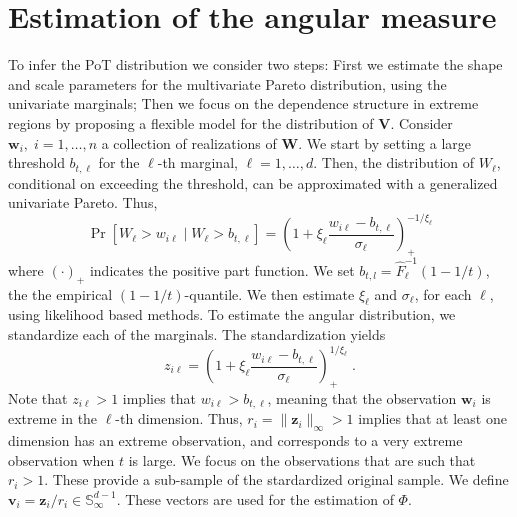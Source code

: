 \section{Estimation of the angular measure\label{sec:methodology}}

To infer the PoT distribution we consider two steps: First we 
    estimate the shape and scale parameters for the
    multivariate Pareto distribution, using the univariate marginals; Then 
    we focus on the dependence structure in extreme regions by proposing a 
    flexible model for the distribution of $\bm{V}$.  
    Consider $\bm{w}_i,\;i =1,\ldots,n$ a collection of realizations of $\bm{W}$.
    We start by setting a large threshold 
    $b_{t,\ell}$ for the  $\ell$-th marginal, $\ell = 1, \ldots,d$. Then, the 
    distribution of $W_\ell$, conditional on exceeding the threshold, can be 
    approximated with a generalized univariate Pareto. Thus,
    \[
    \Pr[W_\ell>w_{i\ell} \mid W_\ell>b_{t,\ell} ]= \left(1 + \xi_\ell
    \frac{w_{i\ell} - b_{t,\ell}}{\sigma_\ell}\right)_+^{-1/\xi_\ell}
    \]
    where $(\cdot)_+$ indicates the positive part function.  We set 
    $b_{t,l}  = \hat{F}^{-1}_{\ell}(1 - 1/t)$, the the empirical $(1-1/t)$-quantile.  
    We then estimate $\xi_\ell$ and $\sigma_\ell$,
    for each $\ell$, using likelihood based methods. To estimate 
    the angular distribution, we standardize each of the marginals. 
    The standardization yields
    \begin{equation}
            \label{eqn:standardization}
            z_{i\ell} = \left(1 + \xi_{\ell}\frac{w_{i\ell} -
                b_{t,\ell}}{\sigma_{\ell}}\right)_{+}^{1/\xi_{\ell}}\; .
        \end{equation}
    Note that $z_{i\ell}> 1$ implies that $w_{i\ell} > b_{t,\ell}$, meaning 
    that the observation $\bm{w}_i$ is extreme in the $\ell$-th dimension. 
    Thus, $r_i = \|\bm{z}_i\|_\infty > 1$ implies that at
    least one dimension has an extreme observation, and corresponds 
    to a very extreme observation when $t$ is large. We focus on 
    the observations that are such that $r_i > 1$. These provide a
    sub-sample of the stardardized original sample. We define $\bm{v}_i = 
    \bm{z}_i /r_i \in  \mathbb{S}_{\infty}^{d-1}$. These vectors are used 
    for  the estimation of $\Phi$. 



